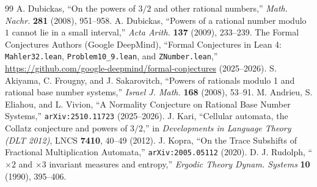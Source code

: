 \documentclass[11pt]{article}
\begin{document}
\begin{thebibliography}{99}
 A. Dubickas, ``On the powers of $3/2$ and other rational numbers,'' \emph{Math. Nachr.} \textbf{281} (2008), 951--958.
 A. Dubickas, ``Powers of a rational number modulo $1$ cannot lie in a small interval,'' \emph{Acta Arith.} \textbf{137} (2009), 233--239.
 The Formal Conjectures Authors (Google DeepMind), ``Formal Conjectures in Lean 4: \texttt{Mahler32.lean}, \texttt{Problem10\_9.lean}, and \texttt{ZNumber.lean},'' \url{https://github.com/google-deepmind/formal-conjectures} (2025--2026).
 S. Akiyama, C. Frougny, and J. Sakarovitch, ``Powers of rationals modulo 1 and rational base number systems,'' \emph{Israel J. Math.} \textbf{168} (2008), 53--91.
 M. Andrieu, S. Eliahou, and L. Vivion, ``A Normality Conjecture on Rational Base Number Systems,'' \texttt{arXiv:2510.11723} (2025--2026).
 J. Kari, ``Cellular automata, the Collatz conjecture and powers of $3/2$,'' in \emph{Developments in Language Theory (DLT 2012)}, LNCS \textbf{7410}, 40--49 (2012).
 J. Kopra, ``On the Trace Subshifts of Fractional Multiplication Automata,'' \texttt{arXiv:2005.05112} (2020).
 D. J. Rudolph, ``$\times 2$ and $\times 3$ invariant measures and entropy,'' \emph{Ergodic Theory Dynam. Systems} \textbf{10} (1990), 395--406.
\end{thebibliography}
\end{document}

